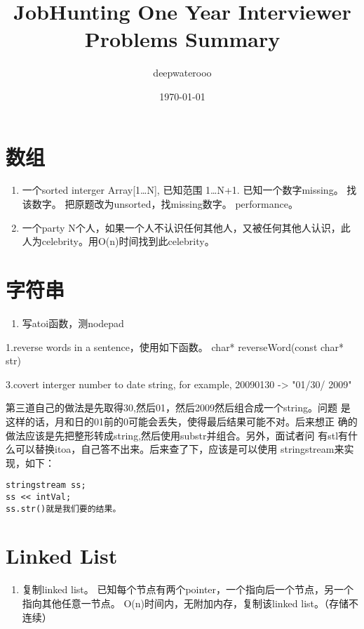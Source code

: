 \documentclass[12pt]{book}
\author{deepwaterooo}
\date{\today}
\title{JobHunting One Year Interviewer Problems Summary}
\begin{document}
\maketitle
\tableofcontents


\chapter{数组}
\label{sec-1}
\begin{enumerate}
\item 一个sorted interger Array[1\ldots{}N], 已知范围 1\ldots{}N+1. 已知一个数字missing。 找该数字。 把原题改为unsorted，找missing数字。 performance。

\item 一个party N个人，如果一个人不认识任何其他人，又被任何其他人认识，此人为celebrity。用O(n)时间找到此celebrity。
\end{enumerate}

\chapter{字符串}
\label{sec-2}
\begin{enumerate}
\item 写atoi函数，测nodepad
\end{enumerate}

1.reverse words in a sentence，使用如下函数。
char* reverseWord(const char* str)

3.covert interger number to date string, for example, 20090130 -> "01/30/
2009"

第三道自己的做法是先取得30,然后01，然后2009然后组合成一个string。问题
是这样的话，月和日的01前的0可能会丢失，使得最后结果可能不对。后来想正
确的做法应该是先把整形转成string,然后使用substr并组合。另外，面试者问
有stl有什么可以替换itoa，自己答不出来。后来查了下，应该是可以使用
stringstream来实现，如下：
\lstset{language=java,label= ,caption= ,numbers=none}
\begin{lstlisting}
stringstream ss;
ss << intVal;
ss.str()就是我们要的结果。
\end{lstlisting}

\chapter{Linked List}
\label{sec-3}
\begin{enumerate}
\item 复制linked list。 已知每个节点有两个pointer，一个指向后一个节点，另一个指向其他任意一节点。 O(n)时间内，无附加内存，复制该linked list。（存储不连续）
\end{enumerate}
\end{document}
